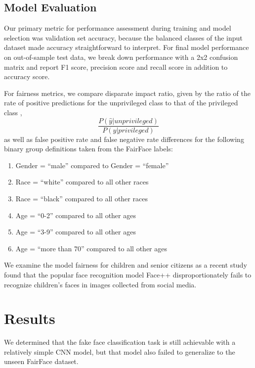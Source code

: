 \documentclass[11pt, letterpaper]{article}
\providecommand{\tightlist}{%
  \setlength{\itemsep}{0pt}\setlength{\parskip}{0pt}
}
\begin{document}
\begin{multicols}{2}
  \subsection{Model Evaluation}

  Our primary metric for performance assessment during training and model
  selection was validation set accuracy, because the balanced classes of the
  input dataset made accuracy straightforward to interpret. For final model
  performance on out-of-sample test data, we break down performance with a 2x2
  confusion matrix and report F1 score, precision score and recall score in
  addition to accuracy score.

  For fairness metrics, we compare disparate impact ratio, given by the ratio
  of the rate of positive predictions for the unprivileged class to that of the
  privileged class \cite{fairMLHealth},
  $$\frac{P(\hat{y}|unprivileged)}{P(\hat{y}|privileged)}$$
  as well as false positive rate and false negative rate differences
  for the following binary group definitions taken from the FairFace
  labels:

  \begin{enumerate}
    \tightlist
  \item Gender = ``male'' compared to Gender = ``female''
  \item Race = ``white'' compared to all other races
  \item Race = ``black'' compared to all other races
  \item Age = ``0-2'' compared to all other ages
  \item Age = ``3-9'' compared to all other ages
  \item Age = ``more than 70'' compared to all other ages
  \end{enumerate}

  We examine the model fairness for children and senior citizens as a recent
  study \cite{9156262} found that the popular face recognition model Face++
  disproportionately fails to recognize children's faces in images collected
  from social media.

  \section{Results}

  We determined that the fake face classification task is
  still achievable with a relatively simple CNN model, but that model also
  failed to generalize to the unseen FairFace dataset.


\end{multicols}
\end{document}
